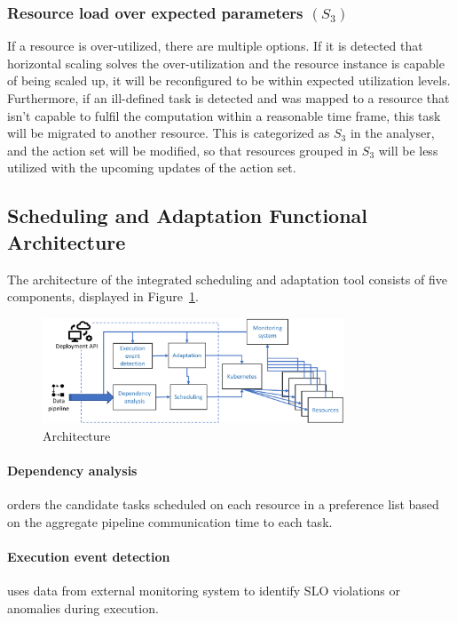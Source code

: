         \subsubsection*{Resource load over expected parameters $(S_3)$} 
        If a resource is over-utilized, there are multiple options. If it is detected that horizontal scaling solves the over-utilization and the resource instance is capable of being scaled up, it will be reconfigured to be within expected utilization levels. Furthermore, if an ill-defined task is detected and was mapped to a resource that isn't capable to fulfil the computation within a reasonable time frame, this task will be migrated to another resource. 
        This is categorized as $S_3$ in the analyser, and the action set will be modified, so that resources grouped in $S_3$ will be less utilized with the upcoming updates of the action set.

    \subsection{Scheduling and Adaptation Functional Architecture}
        The architecture of the integrated \SAA{} scheduling and adaptation tool consists of five components, displayed in Figure~\ref{fig:data-cloud-architecture}.

        \begin{figure}
            \centering
            \includegraphics[width=0.8\textwidth]{pdf/data_cloud_arch.pdf}
            \caption{\SAA Architecture}
            \label{fig:data-cloud-architecture}
        \end{figure}

        \paragraph{Dependency analysis } orders the candidate tasks scheduled on each resource in a preference list based on the aggregate pipeline communication time to each task.

        \paragraph{Execution event detection } uses data from external monitoring system to identify SLO violations or anomalies during execution.

